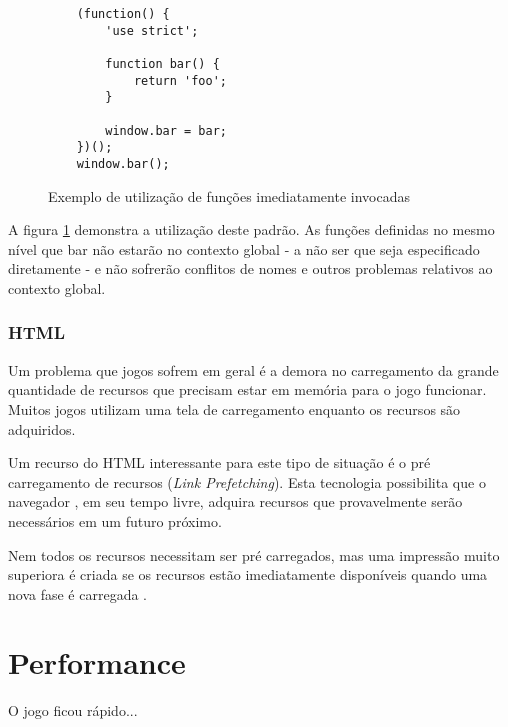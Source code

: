 \begin{figure}
\centering
\begin{verbatim}
    (function() {
        'use strict';

        function bar() {
            return 'foo';
        }

        window.bar = bar;
    })();
    window.bar();
\end{verbatim}
\caption{Exemplo de utilização de funções imediatamente invocadas}
\label{fig:iife}
\end{figure}
\begin{draft}

A figura \ref{fig:iife} demonstra a utilização deste padrão. As
funções definidas no mesmo nível que bar não estarão no contexto
global - a não ser que seja especificado diretamente - e não sofrerão
conflitos de nomes e outros problemas relativos ao contexto global.

\subsubsection{HTML}

Um problema que jogos sofrem em geral é a demora no carregamento da
grande quantidade de recursos que precisam estar em memória para o jogo
funcionar. Muitos jogos utilizam uma tela de carregamento enquanto os 
recursos são adquiridos.

Um recurso do HTML interessante para este tipo de situação é o pré
carregamento de recursos (\textit{Link Prefetching}). Esta tecnologia
possibilita que o navegador , em seu tempo livre, adquira recursos que
provavelmente serão necessários em um futuro próximo.

Nem todos os recursos necessitam ser pré carregados, mas uma impressão
muito superiora é criada se os recursos estão imediatamente
disponíveis quando uma nova fase é carregada \autocite[pp. 39]{creatingFun}.

\section{Performance}

O jogo ficou rápido...

\end{draft}
